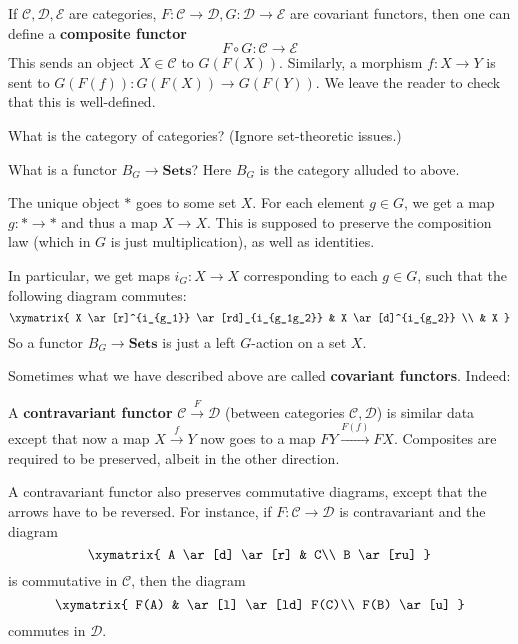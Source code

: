\begin{definition}
If $\mathcal{C}, \mathcal{D}, \mathcal{E}$ are categories, $F: \mathcal{C} \to
\mathcal{D}, G: \mathcal{D} \to \mathcal{E}$ are covariant functors, then one
can define a \textbf{composite functor}
\[ F \circ G: \mathcal{C}  \to \mathcal{E}  \]
This sends an object $X \in \mathcal{C}$ to $G(F(X))$.
Similarly, a morphism $f :X \to Y$ is sent to $G(F(f)): G(F(X)) \to G(F(Y))$.
We leave the reader to check that this is well-defined.
\end{definition}

\begin{exercise}
What is the category of categories? (Ignore set-theoretic issues.)
\end{exercise}


\begin{example}
What is a functor $B_G \stackrel{}{\to} \mathbf{Sets}$? Here $B_G$ is the
category alluded to above.

The unique object $\ast$ goes to some set $X$. For each element $g \in G$, we
get a map $g: \ast \to \ast$ and thus a map $X \to X$. This is supposed to
preserve the composition law (which in $G$ is just multiplication), as well as
identities.

In particular, we get maps $i_G: X \to X$ corresponding to each $g \in G$, such
that the following diagram commutes:
\[ \xymatrix{
X \ar[r]^{i_{g_1}} \ar[rd]_{i_{g_1g_2}} & X \ar[d]^{i_{g_2}} \\ & X
}\]
So a functor $B_G \to \mathbf{Sets}$ is just a left $G$-action on a set $X$.
\end{example}

Sometimes what we have described above are called \textbf{covariant functors}.
Indeed:

\begin{definition}
A \textbf{contravariant functor}  $\mathcal{C}
\stackrel{F}{\to}\mathcal{D}$ (between categories $\mathcal{C}, \mathcal{D}$)
is similar
data except that now a map $X \stackrel{f}{\to} Y$ now goes to a map $FY
\stackrel{F(f)}{\to} FX$. Composites
are required to be preserved, albeit in the other direction.
\end{definition}

A contravariant functor also preserves commutative diagrams, except that the
arrows have to be reversed. For instance, if $F: \mathcal{C} \to \mathcal{D}$
is contravariant and the diagram
\[ \xymatrix{
A \ar[d] \ar[r] &  C\\
B \ar[ru]
}\]
is commutative in $\mathcal{C}$, then the diagram
\[ \xymatrix{
F(A)   & \ar[l] \ar[ld] F(C)\\
F(B) \ar[u]
}\]
commutes in $\mathcal{D}$.

